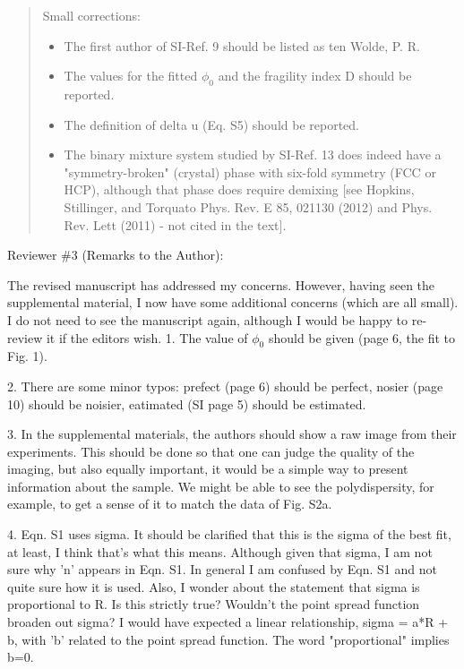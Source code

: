 \documentclass[10pt,a4paper]{letter}
\begin{document}
\begin{letter}{}
\begin{quotation}
Small corrections:
\begin{itemize}
\item The first author of SI-Ref. 9 should be listed as ten Wolde, P. R.
\item The values for the fitted $\phi_0$ and the fragility index D should be reported.
\item The definition of delta u (Eq. S5) should be reported.
\item The binary mixture system studied by SI-Ref. 13 does indeed have a "symmetry-broken" (crystal) phase with six-fold symmetry (FCC or HCP), although that phase does require demixing [see Hopkins, Stillinger, and Torquato Phys. Rev. E 85, 021130 (2012) and Phys. Rev. Lett (2011) - not cited in the text].
\end{itemize}

\end{quotation}

Reviewer \#3 (Remarks to the Author):

The revised manuscript has addressed my concerns. However, having seen the supplemental material, I now have some additional concerns (which are all small). I do not need to see the manuscript again, although I would be happy to re-review it if the editors wish. 1. The value of $\phi_0$ should be given (page 6, the fit to Fig. 1).

2. There are some minor typos: prefect (page 6) should be perfect, nosier (page 10) should be noisier, eatimated (SI page 5) should be estimated.

3. In the supplemental materials, the authors should show a raw image from their experiments. This should be done so that one can judge the quality of the imaging, but also equally important, it would be a simple way to present information about the sample. We might be able to see the polydispersity, for example, to get a sense of it to match the data of Fig. S2a.

4. Eqn. S1 uses sigma. It should be clarified that this is the sigma of the best fit, at least, I think that's what this means. Although given that sigma, I am not sure why 'n' appears in Eqn. S1. In general I am confused by Eqn. S1 and not quite sure how it is used. Also, I wonder about the statement that sigma is proportional to R. Is this strictly true? Wouldn't the point spread function broaden out sigma? I would have expected a linear relationship, sigma = a*R + b, with 'b' related to the point spread function. The word "proportional" implies b=0.


\end{letter}
\end{document}
